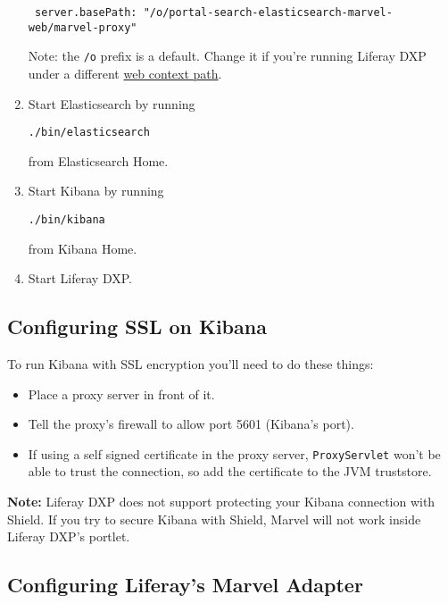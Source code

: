 \begin{enumerate}
\begin{verbatim}
 server.basePath: "/o/portal-search-elasticsearch-marvel-web/marvel-proxy"
\end{verbatim}

  Note: the \texttt{/o} prefix is a default. Change it if you're running
  Liferay DXP under a different
  \href{/docs/7-0/deploy/-/knowledge_base/d/installing-liferay-manually\#making-liferay-portal-coexist-with-other-java-ee-applications}{web
  context path}.
\item
  Start Elasticsearch by running

\begin{verbatim}
./bin/elasticsearch
\end{verbatim}

  from Elasticsearch Home.
\item
  Start Kibana by running

\begin{verbatim}
./bin/kibana
\end{verbatim}

  from Kibana Home.
\item
  Start Liferay DXP.
\end{enumerate}

\subsection{Configuring SSL on
Kibana}\label{configuring-ssl-on-kibana}

To run Kibana with SSL encryption you'll need to do these things:

\begin{itemize}
\tightlist
\item
  Place a proxy server in front of it.
\item
  Tell the proxy's firewall to allow port 5601 (Kibana's port).
\item
  If using a self signed certificate in the proxy server,
  \texttt{ProxyServlet} won't be able to trust the connection, so add
  the certificate to the JVM truststore.
\end{itemize}

\noindent\hrulefill

\textbf{Note:} Liferay DXP does not support protecting your Kibana
connection with Shield. If you try to secure Kibana with Shield, Marvel
will not work inside Liferay DXP's portlet.

\noindent\hrulefill

\subsection{Configuring Liferay's Marvel
Adapter}\label{configuring-liferays-marvel-adapter}

